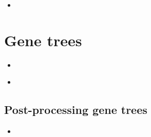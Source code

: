 \documentclass[compress, ucs, xelatex, 11pt, xcolor=x11names, aspectratio=1609,
	hyperref={
		bookmarks=true,
		unicode=true,
		colorlinks=true,
		pdftitle={HybSeq course},
		plainpages=false,
		pdfauthor={Vojtech Zeisek},
		pdfsubject={Practical processing of HybSeq target enrichment sequencing data on computing grids like MetaCentrum},
		pdfcreator={XeLaTeX},
		pdfkeywords={BASH, command line, GNU, HybSeq, Linux, MetaCentrum, sequencing shell, target enrichment},
		linkcolor=Cyan2, %
		anchorcolor=Firebrick2, %
		citecolor=Firebrick2, %
		filecolor=Firebrick2, %
		menucolor=Firebrick2, %
		urlcolor=Chartreuse2, %
		pdftex},
	url={hyphens, lowtilde} %
	]{beamer}
\begin{document}
\begin{frame}[fragile]{}
	\begin{itemize}
		\item 
	\end{itemize}
	\begin{spluscode}
    
	\end{spluscode}
	\begin{bashcode}
    
	\end{bashcode}
\end{frame}

\section{Gene trees}

\begin{frame}[fragile]{}
	\begin{itemize}
		\item 
	\end{itemize}
	\begin{spluscode}
    
	\end{spluscode}
	\begin{bashcode}
    
	\end{bashcode}
\end{frame}

\begin{frame}[fragile]{}
	\begin{itemize}
		\item 
	\end{itemize}
	\begin{spluscode}
    
	\end{spluscode}
	\begin{bashcode}
    
	\end{bashcode}
\end{frame}

\subsection{Post-processing gene trees}

\begin{frame}[fragile]{}
	\begin{itemize}
		\item 
	\end{itemize}
	\begin{spluscode}
    
	\end{spluscode}
	\begin{bashcode}
    
	\end{bashcode}
\end{frame}
\end{document}

